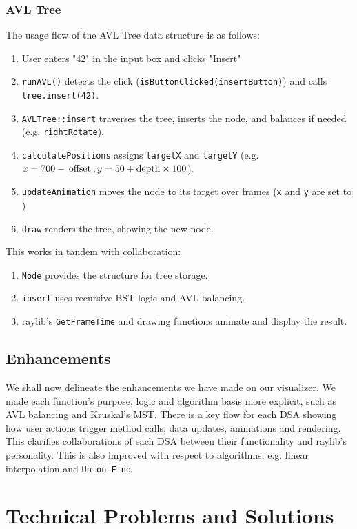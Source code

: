 \documentclass{article}
\begin{document}
\subsubsection{AVL Tree}
The usage flow of the AVL Tree data structure is as follows:
\begin{enumerate}
	\item User enters "42" in the input box and clicks "Insert"
	\item \lstinline|runAVL()| detects the click (\lstinline|isButtonClicked(insertButton)|) and calls \lstinline|tree.insert(42)|.
	\item \lstinline|AVLTree::insert| traverses the tree, inserts the node, and balances if needed (e.g. \lstinline|rightRotate|).
	\item \lstinline|calculatePositions| assigns \lstinline|targetX| and \lstinline|targetY| (e.g. $x = 700 - \text{\lstinline|offset|},y = 50 + \text{\lstinline|depth|}\times100$).
	\item \lstinline|updateAnimation| moves the node to its target over frames (\lstinline|x| and \lstinline|y| are set to )
	\item \lstinline|draw| renders the tree, showing the new node.
\end{enumerate}
This works in tandem with collaboration:
\begin{enumerate}
	\item \lstinline|Node| provides the structure for tree storage.
	\item \lstinline|insert| uses recursive BST logic and AVL balancing.
	\item raylib's \lstinline|GetFrameTime| and drawing functions animate and display the result.
\end{enumerate}

\subsection{Enhancements}
We shall now delineate the enhancements we have made on our visualizer. We made each function's purpose, logic and algorithm basis more explicit, such as AVL balancing and Kruskal's MST. There is a key flow for each DSA showing how user actions trigger method calls, data updates, animations and rendering. This clarifies collaborations of each DSA between their functionality and raylib's personality. This is also improved with respect to algorithms, e.g. linear interpolation and \lstinline|Union-Find|

\section{Technical Problems and Solutions}
\end{document}
